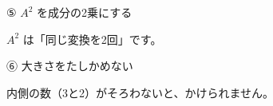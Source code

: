 \noindent\begin{minipage}[t]{0.485\linewidth}\vspace{0pt}
\begin{tsumazuki}{⑤ $A^2$ を成分の2乗にする}
\raggedright
{}
$A^2$ は「同じ変換を2回」です。
\end{tsumazuki}
\end{minipage}\hfill
\begin{minipage}[t]{0.485\linewidth}\vspace{0pt}
\begin{tsumazuki}{⑥ 大きさをたしかめない}
\raggedright
{}
内側の数（3と2）がそろわないと、かけられません。
\end{tsumazuki}
\end{minipage}



